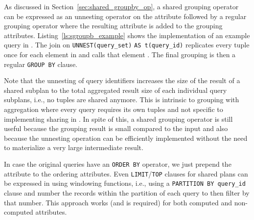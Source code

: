 As discussed in Section~\ref{sec:shared_groupby_op}, a shared grouping operator
can be expressed as an \mbox{unnesting} operator on the \qset attribute followed by a
regular grouping operator where the resulting \qid attribute is added to the
grouping attributes.  Listing~\ref{ls:sgroupb_example} shows the implementation
of an example query in \sql.  The join on
\lstinline[style=sql]{UNNEST(query_set)} \lstinline[style=sql]{AS t(query_id)} replicates every tuple
once for each element in \qset and calls that element \qid.  The final grouping
is then a regular \lstinline[style=sql]{GROUP BY} clause.

Note that the unnesting of query identifiers increases the
size of the result of a shared subplan to the total aggregated result size of
each individual query subplans, i.e., no tuples are shared anymore.  This is
intrinsic to grouping with aggregation where every query requires its own tuples
and not specific to implementing sharing in \sql. In spite of this, a shared
grouping operator is still useful because the grouping result is small
compared to the input and also because the unnesting operation can be
efficiently implemented without the need to materialize a very large
intermediate result.



In case the original queries have an \lstinline[style=sql]{ORDER BY} operator,
we just prepend the \qset attribute to the ordering attributes.  Even
\lstinline[style=sql]{LIMIT}/\lstinline[style=sql]{TOP} clauses for shared plans
can be expressed in \sql using windowing functions, i.e., using a
\lstinline[style=sql]{PARTITION BY query_id} clause and number the records
within the partition of each query to then filter by that number.  This approach
works (and is required) for both computed and non-computed attributes.

